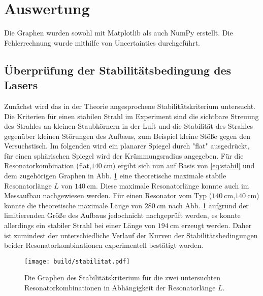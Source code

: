 \section{Auswertung}
\label{sec:Auswertung}
Die Graphen wurden sowohl mit Matplotlib \cite{matplotlib} als auch NumPy \cite{numpy} erstellt. Die
Fehlerrechnung wurde mithilfe von Uncertainties \cite{uncertainties} durchgeführt.

\subsection{Überprüfung der Stabilitätsbedingung des Lasers}
Zunächst wird das in der Theorie angesprochene Stabilitätskriterium untersucht. Die Kriterien für einen stabilen Strahl im Experiment sind die sichtbare Streuung des Strahles an kleinen Staubkörnern in der Luft und die Stabilität des Strahles gegenüber kleinen Störungen des Aufbaus, zum Beispiel kleine Stöße gegen den Versuchstisch. Im folgenden wird ein planarer Spiegel durch "flat" ausgedrückt, für einen sphärischen Spiegel wird der Krümmungsradius angegeben. 
Für die Resonatorkombination (flat,$\SI{140}{\centi\meter}$) ergibt sich nun auf Basis von \ref{eq:stabil} und dem zugehörigen Graphen in Abb. \ref{fig:stabilitat} eine theoretische maximale stabile Resonatorlänge $L$ von $\SI{140}{\centi\meter}$. Diese maximale Resonatorlänge konnte auch im Messaufbau nachgewiesen werden. Für einen Resonator vom Typ ($\SI{140}{\centi\meter}$,$\SI{140}{\centi\meter}$) konnte die theoretische maximale Länge von $\SI{280}{\centi\meter}$ nach Abb. \ref{fig:stabilitat} aufgrund der limitierenden Größe des Aufbaus jedochnicht nachgeprüft werden, es konnte allerdings ein stabiler Strahl bei einer Länge von $\SI{194}{\centi\meter}$ erzeugt werden. Daher ist zumindest der unterschiedliche Verlauf der Kurven der Stabilitätsbedingungen beider Resonatorkombinationen experimentell bestätigt worden.


\begin{figure}
	\centering
	\texttt{[image: build/stabilitat.pdf]}
	\caption{Die Graphen des Stabilitätskriterium für die zwei untersuchten Resonatorkombinationen in Abhängigkeit der Resonatorlänge $L$.}
	\label{fig:stabilitat}
\end{figure}




